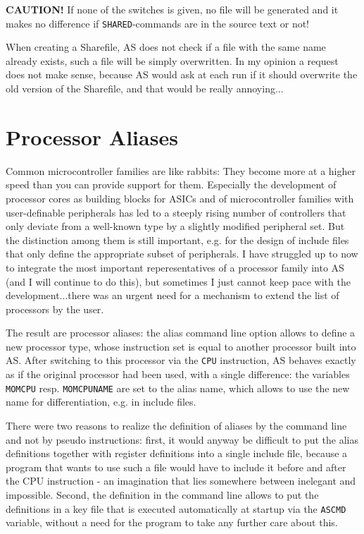 \documentclass[12pt,twoside]{report}
\newcommand{\bb}[1]{{\bf #1}}
\newcommand{\tty}[1]{{\tt #1}}
\newcommand{\asname}{{AS}}
\begin{document}
\bb{CAUTION!} If none of the switches is given, no file will be
generated and it makes no difference if \tty{SHARED}-commands are in the
source text or not!

When creating a Sharefile, \asname{} does not check if a file with the
same name already exists, such a file  will be simply overwritten.
In my opinion a request does not make sense, because \asname{} would
ask at each run if it should overwrite the old version of the
Sharefile, and that would be really annoying...


\section{Processor Aliases}
\label{SectAlias}

Common microcontroller families are like rabbits: They become more at
a higher speed than you can provide support for them.  Especially the
development of processor cores as building blocks for ASICs and of
microcontroller families with user-definable peripherals has led to a
steeply rising number of controllers that only deviate from a
well-known type by a slightly modified peripheral set.  But the
distinction among them is still important, e.g. for the design of
include files that only define the appropriate subset of peripherals.
I have struggled up to now to integrate the most important
reperesentatives of a processor family into \asname{} (and I will continue
to do this), but sometimes I just cannot keep pace with the
development...there was an urgent need for a mechanism to extend the
list of processors by the user.

The result are processor aliases: the alias command line option allows to
define a new processor type, whose instruction set is equal to another
processor built into \asname{}.  After switching to this processor via the
\tty{CPU} instruction, \asname{} behaves exactly as if the original processor had
been used, with a single difference: the variables \tty{MOMCPU} resp.
\tty{MOMCPUNAME} are set to the alias name, which allows to use the new
name for differentiation, e.g. in include files.

There were two reasons to realize the definition of aliases by the
command line and not by pseudo instructions: first, it would anyway be
difficult to put the alias definitions together with register definitions
into a single include file, because a program that wants to use such a
file would have to include it before and after the CPU instruction - an
imagination that lies somewhere between inelegant and impossible.  Second,
the definition in the command line allows to put the definitions in a key
file that is executed automatically at startup via the \tty{ASCMD}
variable, without a need for the program to take any further care about
this.
\end{document}
